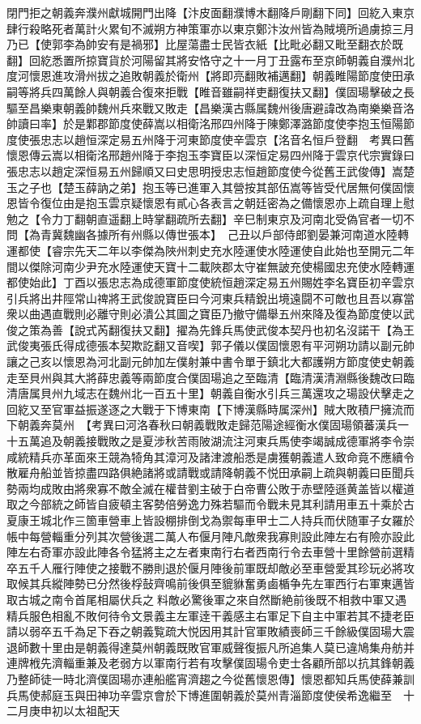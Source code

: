 閉門拒之朝義奔濮州獻城開門出降【汴皮面翻濮博木翻降戶剛翻下同】回紇入東京肆行殺略死者萬計火累旬不滅朔方神策軍亦以東京鄭汴汝州皆為賊境所過虜掠三月乃已【使郭李為帥安有是禍邪】比屋蕩盡士民皆衣紙【比毗必翻又毗至翻衣於既翻】回紇悉置所掠寶貨於河陽留其將安恪守之十一月丁丑露布至京師朝義自濮州北度河懷恩進攻滑州拔之追敗朝義於衛州【將即亮翻敗補邁翻】朝義睢陽節度使田承嗣等將兵四萬餘人與朝義合復來拒戰【睢音雖嗣祥吏翻復扶又翻】僕固瑒擊破之長驅至昌樂東朝義帥魏州兵來戰又敗走【昌樂漢古縣属魏州後唐避諱改為南樂樂音洛帥讀曰率】於是鄴郡節度使薛嵩以相衛洺邢四州降于陳鄭澤潞節度使李抱玉恒陽節度使張忠志以趙恒深定易五州降于河東節度使辛雲京【洺音名恒戶登翻　考異曰舊懷恩傳云嵩以相衛洺邢趙州降于李抱玉李寶臣以深恒定易四州降于雲京代宗實錄曰張忠志以趙定深恒易五州歸順又曰史思明授忠志恒趙節度使今從舊王武俊傳】嵩楚玉之子也【楚玉薛訥之弟】抱玉等已進軍入其營按其部伍嵩等皆受代居無何僕固懷恩皆令復位由是抱玉雲京疑懷恩有貳心各表言之朝廷密為之備懷恩亦上疏自理上慰勉之【令力丁翻朝直遥翻上時掌翻疏所去翻】辛巳制東京及河南北受偽官者一切不問【為青冀魏幽各據所有州縣以傳世張本】　己丑以戶部侍郎劉晏兼河南道水陸轉運都使【睿宗先天二年以李傑為陜州刺史充水陸運使水陸運使自此始也至開元二年間以傑除河南少尹充水陸運使天寶十二載陜郡太守崔無詖充使楊國忠充使水陸轉運都使始此】丁酉以張忠志為成德軍節度使統恒趙深定易五州賜姓李名寶臣初辛雲京引兵將出井陘常山禆將王武俊說寶臣曰今河東兵精銳出境遠闘不可敵也且吾以寡當衆以曲遇直戰則必離守則必潰公其圖之寶臣乃撤守備舉五州來降及復為節度使以武俊之策為善【說式芮翻復扶又翻】擢為先鋒兵馬使武俊本契丹也初名沒諾干【為王武俊夷張氏得成德張本契欺訖翻又音喫】郭子儀以僕固懷恩有平河朔功請以副元帥讓之己亥以懷恩為河北副元帥加左僕射兼中書令單于鎮北大都護朔方節度使史朝義走至貝州與其大將薛忠義等兩節度合僕固瑒追之至臨清【臨清漢清淵縣後魏改曰臨清唐属貝州九域志在魏州北一百五十里】朝義自衡水引兵三萬還攻之瑒設伏擊走之回紇又至官軍益振遂逐之大戰于下博東南【下博漢縣時属深州】賊大敗積尸擁流而下朝義奔莫州　【考異曰河洛春秋曰朝義戰敗走歸范陽途經衡水僕固瑒領蕃漢兵一十五萬追及朝義接戰敗之是夏涉秋苦雨陂湖流注河東兵馬使李竭誠成德軍將李令崇咸統精兵亦革面來王競為犄角其漳河及諸津渡船悉是虜獲朝義遣人致命竟不應續令散雇舟船並皆掠盡四路俱絶諸將或請戰或請降朝義不悦田承嗣上疏與朝義曰臣聞兵勢兩均成敗由將衆寡不敵全滅在權昔劉主破于白帝曹公敗于赤壁陸遜黄盖皆以權道取之今部統之師皆自疲頓主客勢倍勞逸力殊若驅而令戰未見其利請用車五十乘於古夏康王城北作三箇車營車上皆設棚排倒戈為禦每車甲士二人持兵而伏随軍子女羅於帳中每營輜重分列其次營後選二萬人布偃月陣凡敵衆我寡則設此陣左右有險亦設此陣左右奇軍亦設此陣各令猛將主之左者東南行右者西南行令去車營十里餘營前選精卒五千人雁行陣使之接戰不勝則退於偃月陣後前軍既却敵必至車營愛其珍玩必將攻取候其兵縱陣勢已分然後桴鼔齊鳴前後俱至貔貅奮勇鹵楯争先左軍西行右軍東邁皆取古城之南令首尾相屬伏兵之料敵必驚後軍之來自然斷絶前後既不相救中軍又遇精兵服色相亂不敗何待令文景義主左軍逹干義感主右軍足下自主中軍若其不捷老臣請以弱卒五千為足下吞之朝義覧疏大悦因用其計官軍敗績喪師三千餘級僕固瑒大震退師數十里由是朝義得達莫州朝義既敗官軍威聲復振凡所追集人莫已違鳩集舟舫并連牌栰先濟輜重兼及老弱方以軍南行若有攻擊僕固瑒令吏士各顧所部以抗其鋒朝義乃整師徒一時北濟僕固瑒亦連船艦宵濟趨之今從舊懷恩傳】懷恩都知兵馬使薛兼訓兵馬使郝庭玉與田神功辛雲京會於下博進圍朝義於莫州青淄節度使侯希逸繼至　十二月庚申初以太祖配天